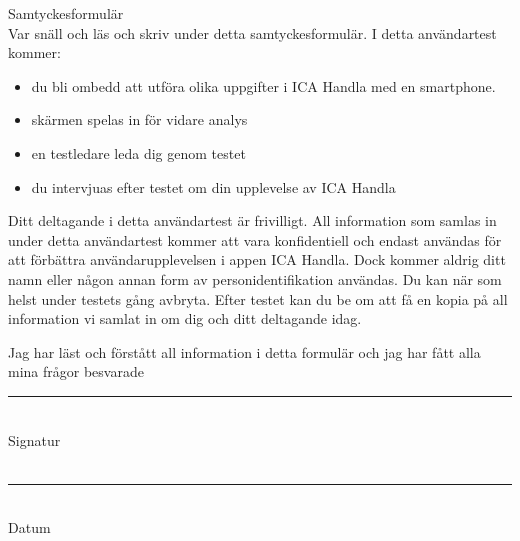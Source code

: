 \documentclass[a4paper,12pt]{article} %
\newcommand{\Qline}[1]{\noindent\rule{#1}{0.6pt}}
\begin{document}
{\LARGE Samtyckesformulär}\\ [.5cm]

Var snäll och läs och skriv under detta samtyckesformulär. I detta användartest kommer:
\begin{itemize}[noitemsep]
  \item du bli ombedd att utföra olika uppgifter i ICA Handla med en smartphone.
  \item skärmen spelas in för vidare analys
  \item en testledare leda dig genom testet
  \item du intervjuas efter testet om din upplevelse av ICA Handla
\end{itemize}

Ditt deltagande i detta användartest är frivilligt. All information som samlas in under detta användartest kommer att vara konfidentiell och endast användas för att förbättra användarupplevelsen i appen ICA Handla. Dock kommer aldrig ditt namn eller någon annan form av personidentifikation användas. Du kan när som helst under testets gång avbryta. Efter testet kan du be om att få en kopia på all information vi samlat in om dig och ditt deltagande idag.

Jag har läst och förstått all information i detta formulär och jag har fått alla mina frågor besvarade
\vspace{1cm} %
\\

\Qline{0.7\textwidth}\\
Signatur\\
\vspace{1cm} %
\\
\Qline{0.7\textwidth}\\
Datum
\end{document}
